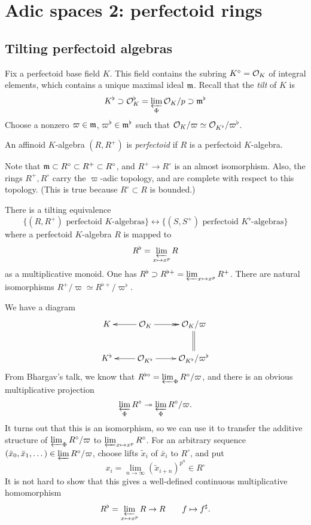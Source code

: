 
\section{Adic spaces 2: perfectoid rings}




\subsection{Tilting perfectoid algebras}

Fix a perfectoid base field $K$. This field contains the subring $K^\circ=\mathcal{O}_K$ 
of integral elements, which contains a unique maximal ideal $\mathfrak{m}$. Recall that 
the \emph{tilt} of $K$ is 
\[
  K^\flat \supset \mathcal{O}_K^\flat = \varprojlim_\Phi \mathcal{O}_K/p\supset \mathfrak{m}^\flat
\]
Choose a nonzero $\varpi\in \mathfrak{m}$, $\varpi^\flat\in \mathfrak{m}^\flat$ such that 
$\mathcal{O}_K/\varpi \simeq \mathcal{O}_{K^\flat}/\varpi^\flat$. 

\begin{definition}
An affinoid $K$-algebra $(R,R^+)$ is \emph{perfectoid} if $R$ is a 
perfectoid $K$-algebra. 
\end{definition}

Note that $\mathfrak{m}\subset R^\circ \subset R^+\subset R^\circ$, and 
$R^+ \to R^\circ$ is an almost isomorphism. Also, the rings $R^+,R^\circ$ carry 
the $\varpi$-adic topology, and are complete with respect to this topology. 
(This is true because $R^\circ\subset R$ is bounded.) 

\begin{proposition}
There is a tilting equivalence 
\[
  \{(R,R^+)\text{ perfectoid $K$-algebras}\} \leftrightarrow \{(S,S^+)\text{ perfectoid $K^\flat$-algebras}\}
\]
where a perfectoid $K$-algebra $R$ is mapped to 
\[
  R^\flat = \varprojlim_{x\mapsto x^p} R
\]
as a multiplicative monoid. One has 
$R^\flat\supset R^{\flat +} = \varprojlim_{x\mapsto x^p} R^+$. There are 
natural isomorphisms $R^+/\varpi \simeq R^{\flat +}/\varpi^\flat$. 
\end{proposition}

We have a diagram 
\[\xymatrix{
  K 
    & \ar[l] \cO_K \ar@{->>}[r] 
    & \cO_K/\varpi \ar@{=}[d] \\
  K^\flat 
    & \ar[l] \cO_{K^\flat} \ar[r] 
    & \cO_{K^\flat} / \varpi^\flat
}\]
From Bhargav's talk, we know that 
$R^{\flat\circ} = \varprojlim_\Phi R^\circ/\varpi$, and there is an obvious multiplicative 
projection 
\[
  \varprojlim_\Phi R^\circ \twoheadrightarrow \varprojlim_\Phi R^\circ/\varpi .
\]
It turns out that this is an isomorphism, so we can use it to transfer the 
additive structure of $\varprojlim_\Phi R^\circ/\varpi$ to $\varprojlim_{x\mapsto x^p} R^\circ$. 
For an arbitrary sequence $(\bar x_0,\bar x_1,\dots)\in \varprojlim R^\circ/\varpi$, 
choose lifts $\tilde x_i$ of $\bar x_i$ to $R^\circ$, and put 
\[
  x_i = \lim_{n\to \infty} (\tilde x_{i+n})^{p^n} \in R^\circ
\]
It is not hard to show that this gives a well-defined continuous multiplicative 
homomorphism 
\[
  R^\flat = \varprojlim_{x\mapsto x^p} R \to R \qquad f\mapsto f^\sharp .
\]

